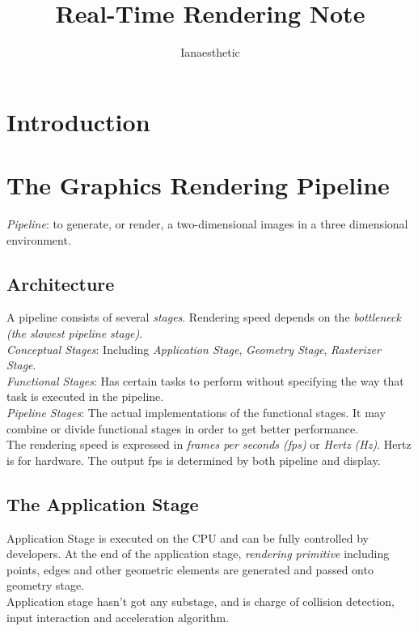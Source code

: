 \documentclass[10pt, a4paper]{article}
\author{Ianaesthetic}
\title{Real-Time Rendering Note}
\begin{document}
\maketitle
\newpage
\section{Introduction\\}

\section{The Graphics Rendering Pipeline}
    \emph{Pipeline}: to generate, or render, a two-dimensional images in a three dimensional environment.
        \subsection{Architecture}
        A pipeline consists of several \emph{stages}. Rendering speed depends on the \emph{bottleneck (the slowest pipeline stage)}.
        \\

        \emph{Conceptual Stages}: Including \emph{Application Stage}, \emph{Geometry Stage}, \emph{Rasterizer Stage}.\\
        \indent\emph{Functional Stages}: Has certain tasks to perform without specifying the way that task is executed in the pipeline.\\
        \indent\emph{Pipeline Stages}: The actual implementations of the functional stages. It may combine or divide functional stages in order to get better performance.\\
        
        The rendering speed is expressed in \emph{frames per seconds (fps)} or \emph{Hertz (Hz)}. Hertz is for hardware. The output fps is determined by both pipeline and display. \\

        \subsection{The Application Stage}
        Application Stage is executed on the CPU and can be fully controlled by developers. At the end of the application stage, \emph{rendering primitive} including points, edges and other geometric elements are generated and passed onto geometry stage. \\
        \indent Application stage hasn't got any substage, and is charge of collision detection, input interaction and acceleration algorithm.\\
\end{document}
